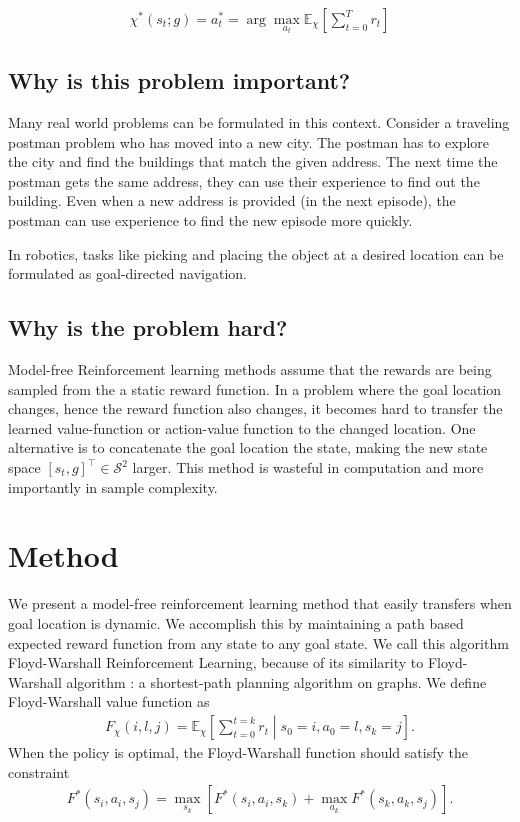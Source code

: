\documentclass[letterpaper]{article} %
\def\state{s}
\def\act{a}
\def\State{\mathcal{S}}
\def\rew{r}
\def\E{\mathbb{E}}
\newcommand{\policy}{\chi}
\newcommand{\fwcost}{F}
\newcommand{\goal}{g}
\begin{document}
%
\begin{align}
\policy^*(\state_t ; \goal) = \act^*_t = \arg \max_{\act_t} \E_{\policy}\left[ \sum_{t=0}^T \rew_t \right]
\end{align}%
%

\subsection{Why is this problem important?}
Many real world problems can be formulated in this context.
Consider a traveling postman problem who has moved into a new city. The postman has
to explore the city and find the buildings that match the given address.
The next time the postman gets the same address, they can use their experience to find out the building.
Even when a new address is provided (in the next episode), the postman can use
experience to find the new episode more quickly.

In robotics, tasks like picking and placing the object at a desired location can be
formulated as goal-directed navigation.

\subsection{Why is the problem hard?}
Model-free Reinforcement learning methods assume that the rewards are being sampled
from the a static reward function.
In a problem where the goal location changes, hence the reward function also changes,
it becomes hard to transfer the learned value-function or action-value function to
the changed location.
One alternative is to concatenate the goal location the state, making the new state space
$[\state_t, \goal]^\top \in \State^2$ larger.
This method is wasteful in computation and more importantly in sample complexity.

\section{Method}
We present a model-free reinforcement learning method that easily transfers when goal
location is dynamic.
We accomplish this by maintaining a path based expected reward function from any state to any goal state.
We call this algorithm Floyd-Warshall Reinforcement Learning, because of its
similarity to Floyd-Warshall algorithm : a shortest-path planning algorithm on graphs.
We define Floyd-Warshall value function as
%
\begin{align}
\fwcost_{\policy}(i, l,  j) =
\E_{\policy}\left[ \sum_{t=0}^{t=k} \rew_t \middle\vert \state_0 = i, \act_0 = l, \state_k = j \right] .
\end{align}%
%
When the policy is optimal, the Floyd-Warshall function should satisfy the constraint
%
\begin{align}
\fwcost^*(\state_i, \act_i, \state_j) = \max_{\state_k} \left[
\fwcost^*(\state_i, \act_i, \state_k)
+ \max_{\act_k}\fwcost^*(\state_k, \act_k, \state_j) \right] .
\end{align}%
%
\end{document}
